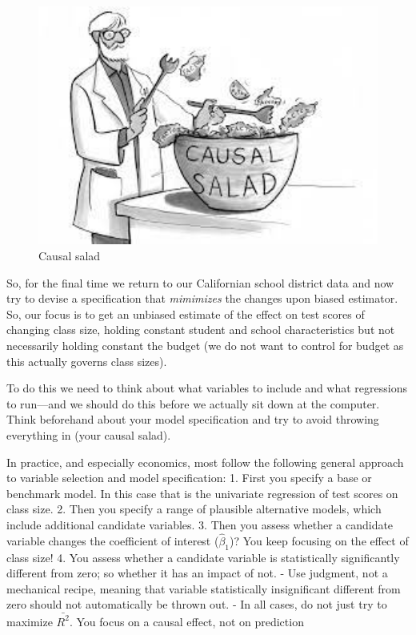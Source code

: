 \documentclass[
]{book}
\begin{document}
\begin{figure}

{\centering \includegraphics[width=600px]{./figures/causalsalad} 

}

\caption{Causal salad}\label{fig:causalsalad}
\end{figure}

So, for the final time we return to our Californian school district data and now try to devise a specification that \emph{mimimizes} the changes upon biased estimator. So, our focus is to get an unbiased estimate of the effect on test scores of changing class size, holding constant student and school characteristics but not necessarily holding constant the budget (we do not want to control for budget as this actually governs class sizes).

To do this we need to think about what variables to include and what regressions to run---and we should do this before we actually sit down at the computer. Think beforehand about your model specification and try to avoid throwing everything in (your causal salad).

In practice, and especially economics, most follow the following general approach to variable selection and model specification:
1. First you specify a base or benchmark model. In this case that is the univariate regression of test scores on class size.
2. Then you specify a range of plausible alternative models, which include additional candidate variables.
3. Then you assess whether a candidate variable changes the coefficient of interest (\(\hat{\beta}_1\))? You keep focusing on the effect of class size!
4. You assess whether a candidate variable is statistically significantly different from zero; so whether it has an impact of not.
- Use judgment, not a mechanical recipe, meaning that variable statistically insignificant different from zero should not automatically be thrown out.
- In all cases, do not just try to maximize \(\bar{R^2}\). You focus on a causal effect, not on prediction
\end{document}
